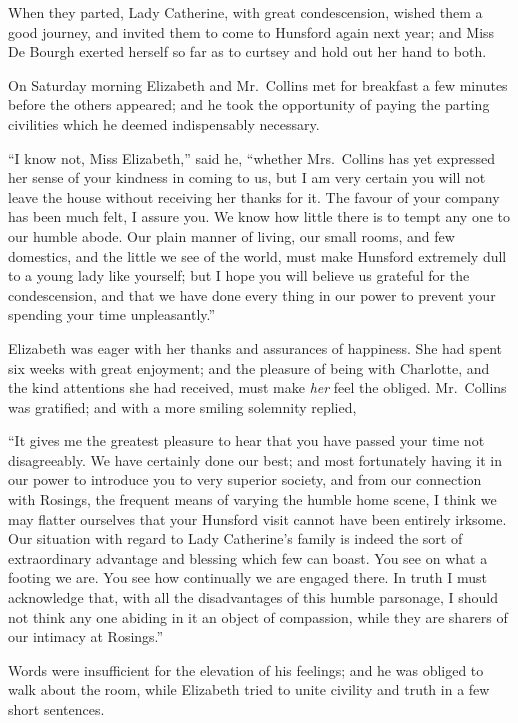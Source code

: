 When they parted, Lady Catherine, with great condescension,
wished them a good journey, and invited them
to come to Hunsford again next year; and Miss De Bourgh
exerted herself so far as to curtsey and hold out her hand
to both.


On Saturday morning Elizabeth and Mr.\ Collins met
for breakfast a few minutes before the others appeared;
and he took the opportunity of paying the parting civilities
which he deemed indispensably necessary.

“I know not, Miss Elizabeth,” said he, “whether
Mrs.\ Coll\-ins has yet expressed her sense of your kindness
in coming to us, but I am very certain you will not leave
the house without receiving her thanks for it. The favour
of your company has been much felt, I assure you. We
know how little there is to tempt any one to our humble
abode. Our plain manner of living, our small rooms, and
few domestics, and the little we see of the world, must
make Hunsford extremely dull to a young lady like yourself;
but I hope you will believe us grateful for the
condescension, and that we have done every thing in our
power to prevent your spending your time unpleasantly.”

Elizabeth was eager with her thanks and assurances of
happiness. She had spent six weeks with great enjoyment;
and the pleasure of being with Charlotte, and the kind
attentions she had received, must make \textit{her} feel the obliged.
Mr.\ Collins was gratified; and with a more smiling
solemnity replied,

“It gives me the greatest pleasure to hear that you
have passed your time not disagreeably. We have
certainly done our best; and most fortunately having it
in our power to introduce you to very superior society,
and from our connection with Rosings, the frequent means
of varying the humble home scene, I think we may flatter
ourselves that your Hunsford visit cannot have been
entirely irksome. Our situation with regard to Lady
Catherine’s family is indeed the sort of extraordinary
advantage and blessing which few can boast. You see
on what a footing we are. You see how continually we are
engaged there. In truth I must acknowledge that, with
all the disadvantages of this humble parsonage, I should
not think any one abiding in it an object of compassion,
while they are sharers of our intimacy at Rosings.”

Words were insufficient for the elevation of his feelings;
and he was obliged to walk about the room, while Elizabeth
tried to unite civility and truth in a few short
sentences.

